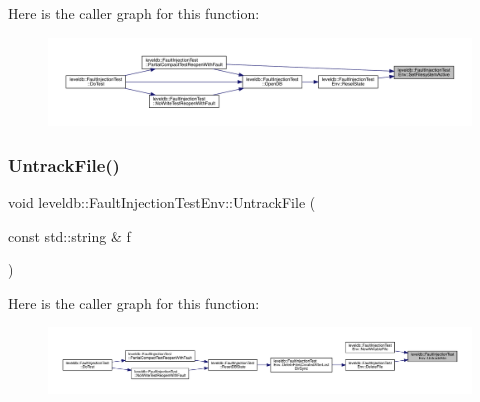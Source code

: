 Here is the caller graph for this function\+:
\nopagebreak
\begin{figure}[H]
\begin{center}
\leavevmode
\includegraphics[width=350pt]{classleveldb_1_1_fault_injection_test_env_a0931f1fd0c96e617dd226cb2cdc44ad7_icgraph}
\end{center}
\end{figure}
\mbox{\label{classleveldb_1_1_fault_injection_test_env_a491627b6a1908395df803482839fa7f1}} 
\subsubsection{\texorpdfstring{UntrackFile()}{UntrackFile()}}
{\footnotesize\ttfamily void leveldb\+::\+Fault\+Injection\+Test\+Env\+::\+Untrack\+File (\begin{DoxyParamCaption}\item[{const std\+::string \&}]{f }\end{DoxyParamCaption})}

Here is the caller graph for this function\+:
\nopagebreak
\begin{figure}[H]
\begin{center}
\leavevmode
\includegraphics[width=350pt]{classleveldb_1_1_fault_injection_test_env_a491627b6a1908395df803482839fa7f1_icgraph}
\end{center}
\end{figure}
\mbox{\label{classleveldb_1_1_fault_injection_test_env_accd10539b6cfa51468fe9cd6b85fd655}} 
